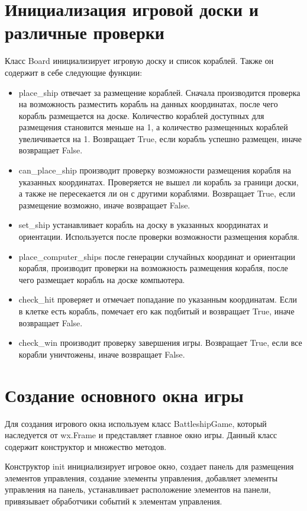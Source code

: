 \section{\label{sec:ch02/sec04}Инициализация игровой доски и различные проверки}
Класс Board инициализирует игровую доску и список кораблей.
Также он содержит в себе следующие функции:
\begin{itemize}
    \item place\_ship отвечает за размещение кораблей. Сначала производится проверка на возможность разместить корабль на данных координатах, после чего корабль размещается на доске. Количество кораблей доступных для размещения становится меньше на 1, а количество размещенных кораблей увеличивается на 1. Возвращает True, если корабль успешно размещен, иначе возвращает False.
    \item can\_place\_ship производит проверку возможности размещения корабля на указанных координатах. Проверяется не вышел ли корабль за граници доски, а также не пересекается ли он с другими кораблями. Возвращает True, если размещение возможно, иначе возвращает False.
    \item set\_ship устанавливает корабль на доску в указанных координатах и ориентации. Используется после проверки возможности размещения корабля.
    \item place\_computer\_ships после генерации случайных координат и ориентации корабля, производит проверки на возможность размещения корабля, после чего размещает корабль на доске компьютера.
    \item check\_hit проверяет и отмечает попадание по указанным координатам. Если в клетке есть корабль, помечает его как подбитый и возвращает True, иначе возвращает False.
    \item check\_win производит проверку завершения игры. Возвращает True, если все корабли уничтожены, иначе возвращает False.
\end{itemize}
\section{\label{sec:ch02/sec05}Создание основного окна игры}
Для создания игрового окна используем класс BattleshipGame, который наследуется от wx.Frame и представляет главное окно игры. Данный класс содержит конструктор и множество методов.

Конструктор init инициализирует игровое окно, создает панель для размещения элементов управления, создание элементы управления, добавляет элементы управления на панель, устанавливает расположение элементов на панели, привязывает обработчики событий к элементам управления.

